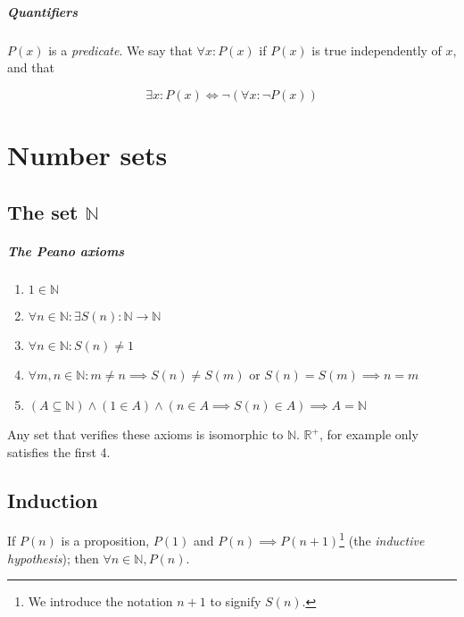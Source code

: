 \documentclass[12pt,a4paper]{report}
\numberwithin{equation}{section}
\theoremstyle{definition}
\theoremstyle{remark}
\begin{document}
\paragraph{Quantifiers}

$P(x)$ is a \emph{predicate}. We say that $\forall x : P(x)$ if $P(x)$ is true independently of $x$, and that

\begin{equation}
\exists x : P(x) \iff \neg ( \forall x : \neg P(x) )
\end{equation}

\chapter{Number sets}

\section{The set $\mathbb{N}$}

\paragraph{The Peano axioms}

\begin{enumerate}
\item $1 \in \mathbb{N}$
\item $\forall n \in \mathbb{N}:  \exists S (n) : \mathbb{N} \rightarrow \mathbb{N}$
\item $\forall n \in \mathbb{N}: S(n) \neq 1$
\item $\forall m, n \in \mathbb{N}: m \neq n \implies S(n) \neq S(m)$ or $S(n) = S(m) \implies n = m$
\item $(A \subseteq \mathbb{N} )\wedge (1 \in A )\wedge (n  \in A \implies S(n) \in A ) \implies A = \mathbb{N}$
\end{enumerate}

Any set that verifies these axioms is isomorphic to $\mathbb{N}$. $\mathbb{R}^{+}$, for example only satisfies the first 4.

\section{Induction}

If $P(n)$ is a proposition, $P(1)$ and $P(n) \implies P(n+1)$\footnote{We introduce the notation $n+1$ to signify $S(n)$.} (the \emph{inductive hypothesis}); then $\forall n \in \mathbb{N}, P(n)$.
\end{document}
